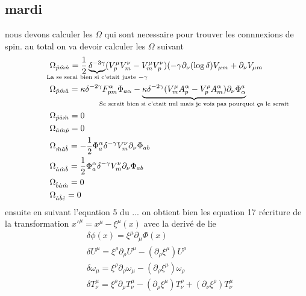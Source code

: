 \documentclass{article}
\begin{document}
\subsection{mardi}
nous devons calculer les $\Omega$ qui sont necessaire pour trouver les connnexions de spin. au total on va devoir calculer les $\Omega$ suivant
\begin{align*}
    &\Omega_{\hat p \hat m \hat n } = \frac{1}{2} \underbrace{\delta^{-3 \gamma}}_{  \mathclap{\text{La se serai bien si c'etait juste } -\gamma }}  ( V^{\mu}_p V^{\nu}_m -V^{\mu}_m V^{\nu}_p)(-\gamma \partial_{\nu}(\log{\delta})V_{\mu m} + \partial_{\nu}V_{\mu m }\\
    &\Omega_{\hat p \hat m \hat a }= \kappa \delta^{-2 \gamma} F^{\alpha}_{pm}\Phi_{a \alpha} - \underbrace{\kappa \delta^{-2 \gamma}(V^{\mu}_m A^{\alpha}_p - V^{\rho}_p A^{\alpha}_m)\partial_{\nu}\Phi^{a}_{\alpha}}_{ \mathclap{\text{Se serait bien si c'etait nul mais je vois pas pourquoi ça le serait}}}\\
    &\Omega_{\hat p \hat a \hat m }=0\\
    &\Omega_{\hat a \hat m \hat p }=0\\
    &\Omega_{\hat m \hat a \hat b }=-\frac{1}{2}\Phi^{\alpha }_a \delta^{- \gamma} V^{\nu}_m \partial_{\nu} \Phi_{ab}\\
    &\Omega_{\hat a \hat m \hat b }= \frac{1}{2}\Phi^{\alpha }_a \delta^{- \gamma} V^{\nu}_m \partial_{\nu} \Phi_{ab} \\
    &\Omega_{\hat b \hat a \hat m } = 0\\
    &\Omega_{\hat a \hat b \hat c } = 0\\
\end{align*}
ensuite en suivant l'equation 5 du ... on obtient bien les equation 17
récriture de la transformation $ x'^{\mu}  = x^{\mu} - \xi^{\mu}(x) $ avec la derivé de lie
\begin{align}
    &\delta \phi(x) = \xi ^ \mu \partial _ \mu \Phi (x) \\
    &\delta U ^ \mu  = \xi ^ \rho \partial _ \rho U ^ \mu - (\partial _ \rho \xi ^ \mu) U ^\rho \\
    &\delta  \omega _ \mu  = \xi ^ \rho \partial _ \rho \omega _\mu - (\partial _ \rho \xi ^ \mu) \omega _\rho \\
    &\delta T ^ \mu _ \nu  = \xi ^ \rho  \partial _ \rho T ^ \mu _ \nu -(\partial _ \rho \xi ^ \mu ) T ^ \rho _ \nu + (\partial _ \nu \xi ^ \rho)T ^ \mu _ \nu 
\end{align}
\end{document}
